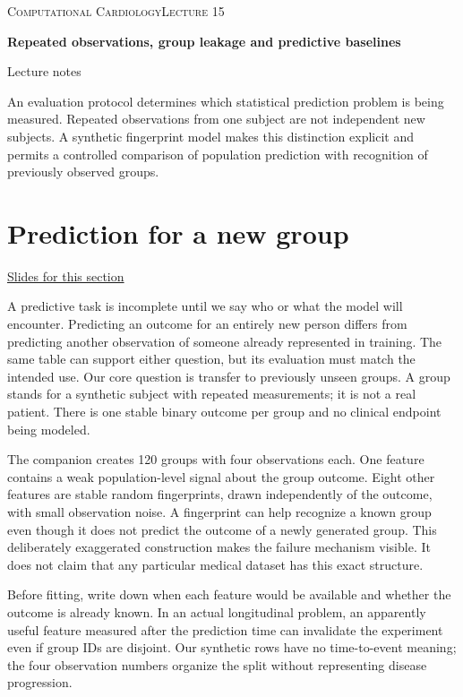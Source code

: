 \documentclass[11pt,letterpaper]{article}
\theoremstyle{definition}\newtheorem{definition}{Definition}\newtheorem{example}{Example}
\numberwithin{equation}{section}
\begin{document}
{\small\scshape Computational Cardiology\hfill Lecture 15}\par\medskip
{\raggedright{}\LARGE\bfseries\color{ink} Repeated observations, group leakage and predictive baselines\par}\medskip
{\small Lecture notes}\par\bigskip
An evaluation protocol determines which statistical prediction problem is being measured. Repeated observations from one subject are not independent new subjects. A synthetic fingerprint model makes this distinction explicit and permits a controlled comparison of population prediction with recognition of previously observed groups.

\section{Prediction for a new group}
\hypertarget{note-prediction-for-a-new-group}{}\label{note:prediction-for-a-new-group}
{\small \href{slides.html\#frame=repeated-rows-share-a-latent-group\&step=1}{Slides for this section}}\par
A predictive task is incomplete until we say who or what the model will encounter. Predicting an outcome for an entirely new person differs from predicting another observation of someone already represented in training. The same table can support either question, but its evaluation must match the intended use. Our core question is transfer to previously unseen groups. A group stands for a synthetic subject with repeated measurements; it is not a real patient. There is one stable binary outcome per group and no clinical endpoint being modeled.

The companion creates 120 groups with four observations each. One feature contains a weak population-level signal about the group outcome. Eight other features are stable random fingerprints, drawn independently of the outcome, with small observation noise. A fingerprint can help recognize a known group even though it does not predict the outcome of a newly generated group. This deliberately exaggerated construction makes the failure mechanism visible. It does not claim that any particular medical dataset has this exact structure.

Before fitting, write down when each feature would be available and whether the outcome is already known. In an actual longitudinal problem, an apparently useful feature measured after the prediction time can invalidate the experiment even if group IDs are disjoint. Our synthetic rows have no time-to-event meaning; the four observation numbers organize the split without representing disease progression.
\end{document}
